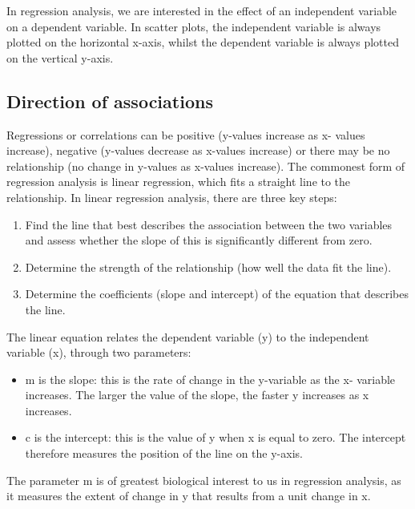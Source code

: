 \documentclass[
]{book}
\providecommand{\tightlist}{%
  \setlength{\itemsep}{0pt}\setlength{\parskip}{0pt}}
\begin{document}
In regression analysis, we are interested in the effect of an independent variable on a dependent variable. In scatter plots, the independent variable is always plotted on the horizontal x-axis, whilst the dependent variable is always plotted on the vertical y-axis.

\hypertarget{direction-of-associations}{%
\subsection*{Direction of associations}\label{direction-of-associations}}

Regressions or correlations can be positive (y-values increase as x- values increase), negative (y-values decrease as x-values increase) or there may be no relationship (no change in y-values as x-values increase). The commonest form of regression analysis is linear regression, which fits a straight line to the relationship. In linear regression analysis, there are three key steps:

\begin{enumerate}
\def\labelenumi{\arabic{enumi})}
\tightlist
\item
  Find the line that best describes the association between the two variables and assess whether the slope of this is significantly different from zero.
\item
  Determine the strength of the relationship (how well the data fit the line).
\item
  Determine the coefficients (slope and intercept) of the equation that describes the line.
\end{enumerate}

The linear equation relates the dependent variable (y) to the independent variable (x), through two parameters:

\begin{itemize}
\tightlist
\item
  m is the slope: this is the rate of change in the y-variable as the x- variable increases. The larger the value of the slope, the faster y increases as x increases.
\item
  c is the intercept: this is the value of y when x is equal to zero. The intercept therefore measures the position of the line on the y-axis.
\end{itemize}

The parameter m is of greatest biological interest to us in regression analysis, as it measures the extent of change in y that results from a unit change in x.
\end{document}
